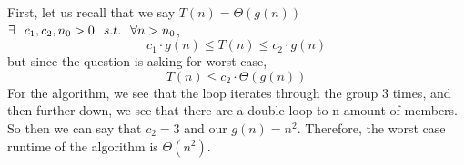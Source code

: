 \documentclass[11pt,fleqn]{exam}
\newif\ifsolutions\solutionsfalse
\newenvironment{soln}{\color{solnblue}}{}
\begin{document}
\begin{questions}
\begin{soln}
	First, let us recall that we say $T(n) = \Theta(g(n))$ 
	$\exists \hspace{0.1in} c_1, c_2, n_0 > 0 \hspace{0.1in} s.t. \hspace{0.1in} \forall n > n_0$, 
	\[ c_1 \cdot g(n) \le T(n) \le c_2 \cdot g(n) \]
	but since the question is asking for worst case,
	\[ T(n) \le c_2 \cdot \Theta(g(n)) \]
	For the algorithm, we see that the loop iterates through the group 3 times, and then
	further down, we see that there are a double loop to n amount of members.
	So then we can say that $c_2 = 3$ and our $g(n) = n^2$.
	Therefore, the worst case runtime of the algorithm is $\Theta(n^2)$.

\end{soln}

   \ifsolutions
    
\fi
\end{questions}
\end{document}

